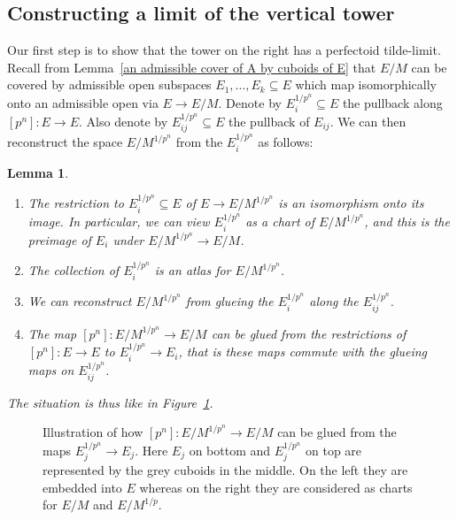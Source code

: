 \documentclass[10pt,oneside]{amsart}
\newtheorem{lemma}[theorem]{Lemma}
\theoremstyle{definition}
\theoremstyle{remark}
\begin{document}
		\subsection{Constructing a limit of the vertical tower}
		
		Our first step is to show that the tower on the right has a perfectoid tilde-limit.
		Recall from Lemma~\ref{an admissible cover of A by cuboids of E} that $E/M$ can be covered by admissible open subspaces $E_1,\dots,E_k\subseteq E$ which map isomorphically onto an admissible open via $E\to E/M$. Denote by $E_i^{1/p^n}\subseteq E$ the pullback along $[p^n]:E\rightarrow E$. Also denote by $E_{ij}^{1/p^n}\subseteq E$ the pullback of $E_{ij}$. We can then reconstruct the space $E/M^{1/p^n}$ from the $E_i^{1/p^n}$ as follows:
		\begin{lemma}\label{compatible cuboid charts for the tower over E/M}
			\leavevmode
			\begin{enumerate}
		\item The restriction to $E_{i}^{1/p^n}\subseteq E$ of $E\rightarrow E/M^{1/p^n}$ is an isomorphism onto its image. In particular, we can view $E_{i}^{1/p^n}$ as a chart of $E/M^{1/p^n}$, and this is the preimage of $E_i$ under $E/M^{1/p^n}\rightarrow E/M$.
		\item The collection of  $E_{i}^{1/p^n}$ is an atlas for  $E/M^{1/p^n}$. 
		\item We can reconstruct $E/M^{1/p^n}$ from glueing the $E_{i}^{1/p^n}$ along the $E_{ij}^{1/p^n}$.
		\item The map $[p^n]:E/M^{1/p^n}\rightarrow E/M$ can be glued from the restrictions of $[p^n]:E\rightarrow E$ to $E_{i}^{1/p^n}\rightarrow E_{i}$, that is these maps commute with the glueing maps on $E_{ij}^{1/p^n}$.
		\end{enumerate}
		The situation is thus like in Figure~\ref{transform-glue-cover-tikzpicture}.
		\end{lemma}
			\begin{figure}
				
				\caption{Illustration of how $[p^n]:E/M^{1/p^n}\rightarrow E/M$ can be glued from the maps $E_j^{1/p^n}\rightarrow E_j$. Here $E_j$ on bottom and $E_j^{1/p^n}$ on top are represented by the grey cuboids in the middle. On the left they are embedded into $E$ whereas on the right they are considered as charts for $E/M$ and $E/M^{1/p}$.}
				\label{transform-glue-cover-tikzpicture}
			\end{figure}
\end{document}

